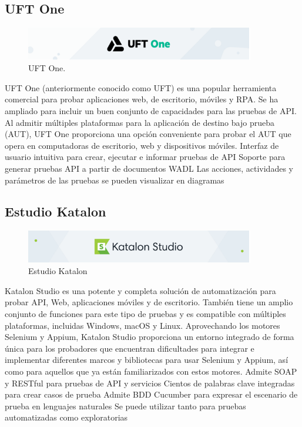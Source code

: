\documentclass[12pt,letterpaper]{article}
\begin{document}
\subsection{UFT One}
\begin{figure}[h]
    \begin{center}
    \includegraphics[width=10cm]{./Imagenes/image1.png}
    \caption{UFT One.}
    \label{rg2}
    \end{center}
    \end{figure}
UFT One (anteriormente conocido como UFT) es una popular herramienta comercial para probar aplicaciones web, de escritorio, móviles y RPA. Se ha ampliado para incluir un buen conjunto de capacidades para las pruebas de API. Al admitir múltiples plataformas para la aplicación de destino bajo prueba (AUT), UFT One proporciona una opción conveniente para probar el AUT que opera en computadoras de escritorio, web y dispositivos móviles.
Interfaz de usuario intuitiva para crear, ejecutar e informar pruebas de API
Soporte para generar pruebas API a partir de documentos WADL
Las acciones, actividades y parámetros de las pruebas se pueden visualizar en diagramas

\subsection{Estudio Katalon}

\begin{figure}[h]
    \begin{center}
    \includegraphics[width=10cm]{./Imagenes/image2.png}
    \caption{Estudio Katalon}
    \label{rg3}
    \end{center}
    \end{figure}
Katalon Studio es una potente y completa solución de automatización para probar API, Web, 
aplicaciones móviles y de escritorio. También tiene un amplio conjunto de funciones para este 
tipo de pruebas y es compatible con múltiples plataformas, incluidas Windows, macOS y Linux.
Aprovechando los motores Selenium y Appium, Katalon Studio proporciona un entorno integrado de 
forma única para los probadores que encuentran dificultades para integrar e implementar diferentes 
marcos y bibliotecas para usar Selenium y Appium, así como para aquellos que ya están familiarizados 
con estos motores.
Admite SOAP y RESTful para pruebas de API y servicios
Cientos de palabras clave integradas para crear casos de prueba
Admite BDD Cucumber para expresar el escenario de prueba en lenguajes naturales
Se puede utilizar tanto para pruebas automatizadas como exploratorias
\end{document}
